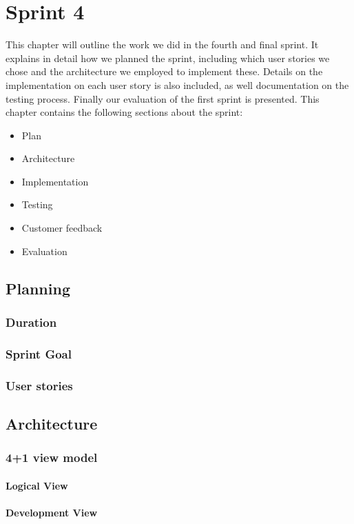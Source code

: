 \chapter{Sprint 4}
This chapter will outline the work we did in the fourth and final sprint. It explains in detail how we planned the sprint, including which user stories we chose and the architecture we employed to implement these. Details on the implementation on each user story is also included, as well documentation on the testing process. Finally our evaluation of the first sprint is presented. This chapter contains the following sections about the sprint:
\begin{itemize}
\item Plan
\item Architecture
\item Implementation
\item Testing
\item Customer feedback
\item Evaluation
\end{itemize}


\section{Planning}
\subsection{Duration}
\subsection{Sprint Goal}
\subsection{User stories}
\section{Architecture}
\subsection{4+1 view model}
\subsubsection{Logical View}
\subsubsection{Development View}
